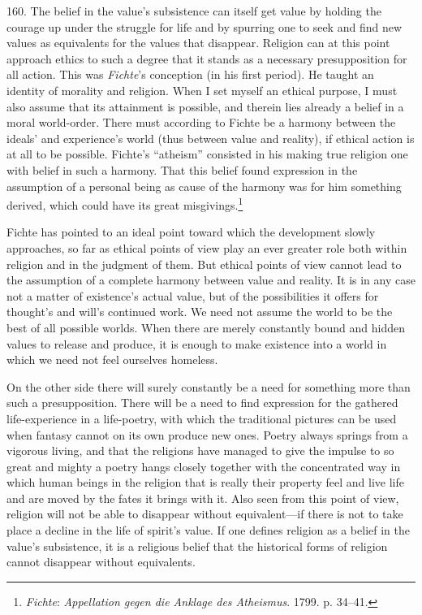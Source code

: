 \documentclass[12pt,a4paper]{book}
\newcommand{\opage}[1]{\marginnote{\footnotesize\textit{[#1]}}}
\begin{document}
160. The belief in the value's subsistence can itself get value by holding the courage up under the struggle
for life and by spurring one to seek and find new values as equivalents for the values that disappear.
Religion can at this point approach ethics to such a degree that it stands as a necessary presupposition for
all action. This was \emph{Fichte}'s conception (in his first period). He taught an identity of morality and
religion. When I set myself an ethical purpose, I must also assume that its attainment is possible, and
therein lies already a belief in a moral world-order. There must according to Fichte be a harmony between the
ideals' and experience's world (thus between value and reality), if ethical action is at all to be possible.
Fichte's ``atheism'' consisted in his making true religion one with belief in such a harmony. That this belief
found expression in the assumption of a personal being as cause of the harmony was for him something derived,
which could have its great misgivings.\footnote{\emph{Fichte}: \emph{Appellation gegen die Anklage des
Atheismus}. 1799. p. 34--41.}

Fichte has pointed to an ideal point toward which the development slowly approaches, so far as ethical points
of view play an ever greater role both within religion and in the judgment of them. But ethical points of view
cannot lead to the assumption of a complete harmony between value and reality. It is in any case not a matter
of existence's actual value, but of the possibilities it offers for thought's and will's continued work. We
need not assume the world to be the best of all possible worlds. When there are merely constantly bound and
hidden values to release and produce, it is enough to make existence into a world in which we need not feel
ourselves homeless.

On the other side there will surely constantly be a need for something more than such a presupposition. There
will be a need to find expression for the gathered life-experience \opage{385}in a life-poetry, with which the traditional
pictures can be used when fantasy cannot on its own produce new ones. Poetry always springs from a vigorous
living, and that the religions have managed to give the impulse to so great and mighty a poetry hangs closely
together with the concentrated way in which human beings in the religion that is really their property feel and
live life and are moved by the fates it brings with it. Also seen from this point of view, religion will not be
able to disappear without equivalent---if there is not to take place a decline in the life of spirit's value. If one defines religion as a belief in the value's subsistence, it is a religious belief that the historical forms of
religion cannot disappear without equivalents.
\end{document}
